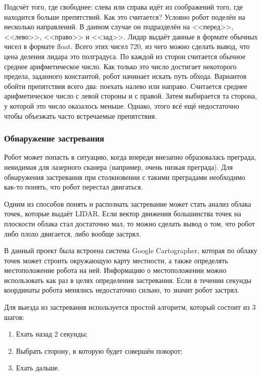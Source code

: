 Подсчёт того, где свободнее: слева или справа идёт из соображений того, где находится больше препятствий. Как это считается? Условно робот поделён на несколько направлений. В данном случае он подразделён на <<перед>>, <<лево>>, <<право>> и <<зад>>. Лидар выдаёт данные в формате обычных чисел в формате float. Всего этих чисел 720, из чего можно сделать вывод, что цена деления лидара это полградуса. По каждой из сторон считается обычное среднее арифметическое число. Как только это число достигает некоторого предела, заданного константой, робот начинает искать путь обхода. Вариантов обойти препятствия всего два: поехать налево или направо. Считается среднее арифметическое число с левой стороны и с правой. Затем выбирается та сторона, у которой это число оказалось меньше. Однако, этого всё ещё недостаточно чтобы объезжать часто встречаемые препятствия. 

\subsubsection{Обнаружение застревания}

Робот может попасть в ситуацию, когда впереди внезапно образовалась преграда, невидимая для лазерного сканера (например, очень низкая преграда). Для обнаружения застревания при столкновении с такими преградами необходимо как-то понять, что робот перестал двигаться. 

Одним из способов понять и распознать застревание может стать анализ облака точек, которые выдаёт LIDAR. Если вектор движения большинства точек на плоскости облака стал достаточно мал, то можно сделать вывод о том, что робот либо плохо двигается, либо вообще застрял. 

В данный проект была встроена система Google Cartographer, которая по облаку точек может строить окружающую карту местности, а также определять местоположение робота на ней. Информацию о местоположении можно использовать как раз в целях определения застревания. Если в течении секунды координаты робота менялись недостаточно сильно, то значит робот застрял.

Для выезда из застревания используется простой алгоритм, который состоит из 3 шагов:

\begin{enumerate}
\item Ехать назад 2 секунды;
\item Выбрать сторону, в которую будет совершён поворот;
\item Ехать дальше.
\end{enumerate}

